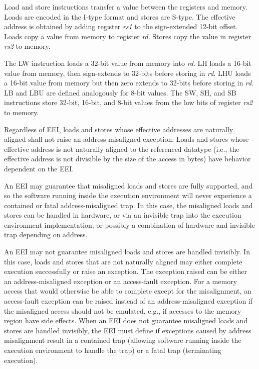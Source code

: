 Load and store instructions transfer a value between the registers and
memory.  Loads are encoded in the I-type format and stores are
S-type.  The effective address is obtained by adding register
{\em rs1} to the sign-extended 12-bit offset.  Loads copy a value
from memory to register {\em rd}.  Stores copy the value in register
{\em rs2} to memory.

The LW instruction loads a 32-bit value from memory into {\em rd}.  LH
loads a 16-bit value from memory, then sign-extends to 32-bits before
storing in {\em rd}. LHU loads a 16-bit value from memory but then
zero extends to 32-bits before storing in {\em rd}.  LB and LBU are
defined analogously for 8-bit values.  The SW, SH, and SB instructions
store 32-bit, 16-bit, and 8-bit values from the low bits of register
{\em rs2} to memory.

Regardless of EEI, loads and stores whose effective addresses are
naturally aligned shall not raise an address-misaligned exception.
Loads and stores whose effective address is not naturally aligned
to the referenced datatype (i.e., the effective address is
not divisible by the size of the access in bytes) have behavior
dependent on the EEI.

An EEI may guarantee that misaligned loads and stores are fully
supported, and so the software running inside the execution
environment will never experience a contained or fatal
address-misaligned trap.  In this case, the misaligned loads and
stores can be handled in hardware, or via an invisible trap into the
execution environment implementation, or possibly a combination of
hardware and invisible trap depending on address.

An EEI may not guarantee misaligned loads and stores are handled
invisibly.  In this case, loads and stores that are not naturally
aligned may either complete execution successfully or raise an
exception.  The exception raised can be either an address-misaligned
exception or an access-fault exception.  For a memory access that would
otherwise be able to complete except for the misalignment, an
access-fault exception can be raised instead of an address-misaligned
exception if the misaligned access should not be emulated, e.g., if
accesses to the memory region have side effects.  When an EEI does not
guarantee misaligned loads and stores are handled invisibly, the EEI
must define if exceptions caused by address misalignment result in a
contained trap (allowing software running inside the execution
environment to handle the trap) or a fatal trap (terminating
execution).

